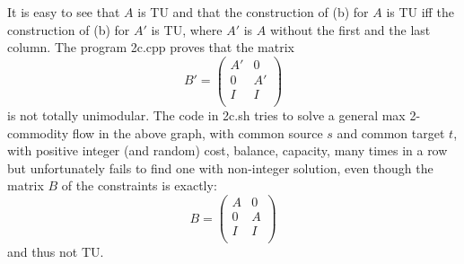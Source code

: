 \documentclass[12pt]{article}
\newenvironment{a_enum}{\begin{enumerate}[label=(\alph{*})]}{\end{enumerate}} %
\begin{document}
\begin{a_enum}
\begin{center}
\end{center}
It is easy to see that $A$ is TU and that the construction of (b) for $A$ is TU iff the construction of (b) for $A'$ is TU, where $A'$ is $A$ without the first and the last column. The program {\rm 2c.cpp} proves that the matrix
$$B'=\left(\begin{array}{cc}A'&0\\0&A'\\I&I\\\end{array}\right)$$
is not totally unimodular. The code in {\rm 2c.sh} tries to solve a general max 2-commodity flow in the above graph, with common source $s$ and common target $t$, with positive integer (and random) cost, balance, capacity, many times in a row but unfortunately fails to find one with non-integer solution, even though the matrix $B$ of the constraints is exactly:
$$B=\left(\begin{array}{cc}A&0\\0&A\\I&I\\\end{array}\right)$$
and thus not TU.
\end{a_enum}
\end{document}
